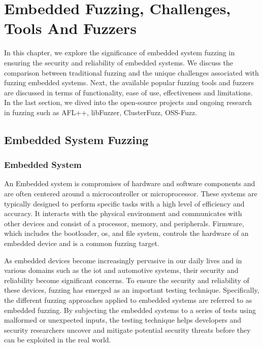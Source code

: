 \vspace{21.5pt}
\chapter{Embedded Fuzzing, Challenges, Tools And Fuzzers}
In this chapter, we explore the significance of embedded system fuzzing in ensuring
the security and reliability of embedded systems. We discuss the comparison between traditional
fuzzing and the unique challenges associated with fuzzing embedded systems.
Next, the available popular fuzzing tools and fuzzers are discussed in terms of
functionality, ease of use, effectiveness and limitations.
In the last section, we dived into the open-source projects and ongoing research
in fuzzing such as AFL++\cite{257204}, libFuzzer\cite{libFuzze17:online},
ClusterFuzz\cite{ClusterF78:online}, OSS-Fuzz\cite{GitHubgo49:online}.

\section{Embedded System Fuzzing}

\subsection{Embedded System}

An Embedded system is compromises of hardware and software components and are often centered around
a microcontroller or microprocessor. These systems are typically designed to perform specific
tasks with a high level of efficiency and accuracy\cite{marwedel2021embedded}.
It interacts with the physical environment and communicates with other devices and consist of a
processor, memory, and peripherals. Firmware, which includes the bootloader, \acrlong{os},
and file system, controls the hardware of an embedded device and is a common
fuzzing target\cite{yun2022fuzzing}.

As embedded devices become increasingly pervasive in our daily lives and in various domains such as the \acrlong{iot}
and automotive systems, their security and reliability become significant concerns.
To ensure the security and reliability of these devices, fuzzing has emerged as an
important testing technique. Specifically, the different fuzzing approaches applied
to embedded systems are referred to as embedded fuzzing\cite{eisele2022embedded}. By subjecting the
embedded systems to a series of tests using malformed or unexpected inputs, the
testing technique helps developers and security researchers uncover and mitigate
potential security threats before they can be exploited in the real world.

